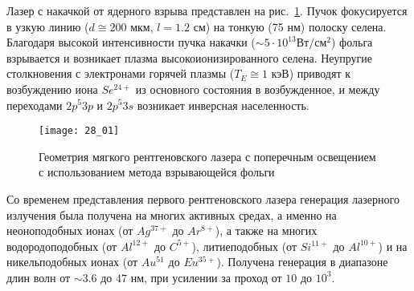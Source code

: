 Лазер с накачкой от ядерного взрыва представлен на рис.~\ref{img28.1}. 
Пучок фокусируется в узкую линию (\( d \cong 200 \) мкм, 
\( l = 1.2 \) см) на тонкую (75 нм) полоску селена. Благодаря высокой 
интенсивности пучка накачки (\( \sim 5\cdot10^{13} \text{Вт}/{см}^2 \)) 
фольга взрывается и возникает плазма высокоионизированного селена. Неупругие 
столкновения с электронами горячей плазмы (\( T_E \cong 1 \) кэВ) приводят 
к возбуждению иона \( Se^{24+} \) из основного состояния в возбужденное, и 
между переходами \( 2p^5 3p \) и \( 2p^5 3s \) возникает инверсная 
населенность.

\begin{figure}[h!]
    \center
    \texttt{[image: 28\_01]}
    \caption{Геометрия мягкого рентгеновского лазера с поперечным 
    	освещением с использованием метода взрывающейся фольги}
    \label{img28.1}
\end{figure}

Со временем представления первого рентгеновского лазера генерация лазерного 
излучения была получена на многих активных средах, а именно на неоноподобных 
ионах (от \( Ag^{37+} \) до \( Ar^{8+} \)), а также на многих водородоподобных 
(от \( Al^{12+} \) до \( C^{5+} \)), литиеподобных (от 
\( Si^{11+} \) до \( Al^{10+} \)) и на никельподобных ионах 
(от \( Au^{51} \) до \( Eu^{35+} \)). Получена генерация в диапазоне длин волн 
от \( \sim 3.6 \) до \( 47 \) нм, при усилении за проход от \( 10 \) до 
\( 10^3 \).